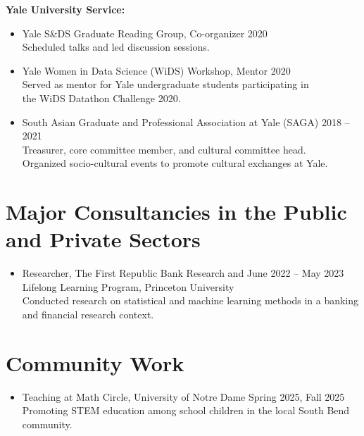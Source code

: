 \documentclass[11pt]{article}
\begin{document}
	\noindent\textbf{Yale University Service:}
	\begin{itemize}[leftmargin=0pt, label={}]
		\item Yale S\&DS Graduate Reading Group, Co-organizer \hfill 2020\\
		Scheduled talks and led discussion sessions.
		
		\item Yale Women in Data Science (WiDS) Workshop, Mentor \hfill 2020\\
		Served as mentor for Yale undergraduate students participating in \\
		the WiDS Datathon Challenge 2020.
		
		\item South Asian Graduate and Professional Association at Yale (SAGA) \hfill 2018 -- 2021\\
		Treasurer, core committee member, and cultural committee head.\\
		Organized socio-cultural events to promote cultural exchanges at Yale.
	\end{itemize}
	
	\section*{Major Consultancies in the Public and Private Sectors}
	
	\begin{itemize}[leftmargin=0pt, label={}]
		\item Researcher, The First Republic Bank Research and \hfill June 2022 -- May 2023\\
		Lifelong Learning Program, Princeton University\\
		Conducted research on statistical and machine learning methods in a banking and financial research context.
	\end{itemize}
	
	\section*{Community Work}
	
	\begin{itemize}[leftmargin=0pt, label={}]
		\item Teaching at Math Circle, University of Notre Dame \hfill Spring 2025, Fall 2025\\
		Promoting STEM education among school children in the local South Bend community.
	\end{itemize}
	
\end{document}
